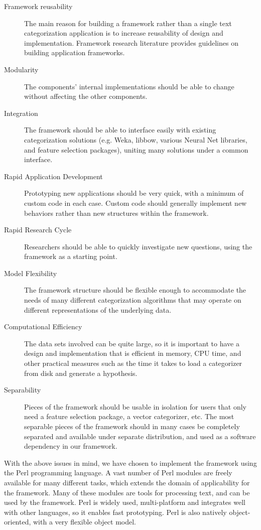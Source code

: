 \documentclass[twocolumn]{article}
\begin{document}
\begin{description}
\item[Framework reusability] The main reason for building a framework
rather than a single text categorization application is to increase
reusability of design and implementation.  Framework research
literature provides guidelines on building application
frameworks.\cite{fayad:99}
\item[Modularity] The components' internal implementations should be
able to change without affecting the other components.
\item[Integration] The framework should be able to interface easily
with existing categorization solutions (e.g. Weka, libbow, various
Neural Net libraries, and feature selection packages), uniting many
solutions under a common interface.
\item[Rapid Application Development] Prototyping new applications
should be very quick, with a minimum of custom code in each case.
Custom code should generally implement new behaviors rather than new
structures within the framework.
\item[Rapid Research Cycle] Researchers should be able to quickly
investigate new questions, using the framework as a starting point.
\item[Model Flexibility] The framework structure should be flexible
enough to accommodate the needs of many different categorization
algorithms that may operate on different representations of the
underlying data.
\item[Computational Efficiency] The data sets involved can be quite
large, so it is important to have a design and implementation that is
efficient in memory, CPU time, and other practical measures such as
the time it takes to load a categorizer from disk and generate a
hypothesis.
\item[Separability] Pieces of the framework should be usable in
isolation for users that only need a feature selection package, a
vector categorizer, etc.  The most separable pieces of the framework
should in many cases be completely separated and available under
separate distribution, and used as a software dependency in our
framework.
\end{description}

With the above issues in mind, we have chosen to implement the
framework using the Perl programming language. \cite{Wall:00} A vast
number of Perl modules are freely available for many different tasks,
which extends the domain of applicability for the framework. Many of
these modules are tools for processing text, and can be used by the
framework. Perl is widely used, multi-platform and integrates well
with other languages, so it enables fast prototyping. Perl is also
natively object-oriented, with a very flexible object
model. \cite{conway:99}
\end{document}
